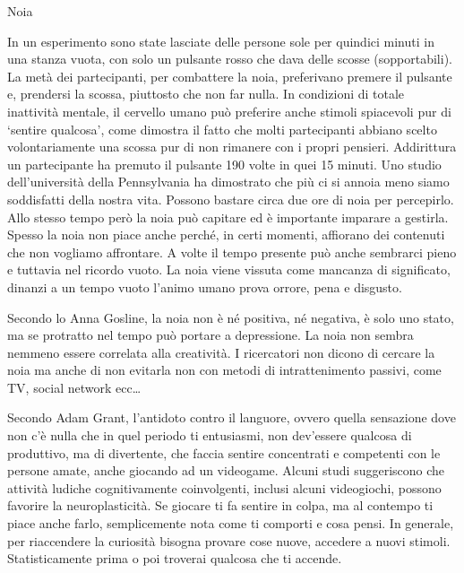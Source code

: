 \documentclass[12pt]{book} %
\begin{document}
\begin{mdframed}[linewidth=1pt]
Noia

In un esperimento sono state lasciate delle persone sole per quindici minuti in una stanza vuota, con solo un pulsante
rosso che dava delle scosse (sopportabili). La metà dei partecipanti, per combattere la noia, preferivano premere il
pulsante e, prendersi la scossa, piuttosto che non far nulla. In condizioni di totale inattività mentale, il cervello umano può preferire anche stimoli spiacevoli pur di ‘sentire qualcosa’, come dimostra il fatto che molti partecipanti abbiano scelto volontariamente una scossa pur di non rimanere con i propri pensieri. Addirittura un partecipante ha premuto il pulsante 190 volte in quei 15
minuti. Uno studio dell'università della Pennsylvania
ha dimostrato che più ci si annoia meno siamo soddisfatti della nostra vita. Possono bastare circa due ore di noia per
percepirlo. Allo stesso tempo però la noia può capitare ed è importante imparare a gestirla.
Spesso la noia non piace anche perché, in certi momenti, affiorano dei contenuti che non vogliamo affrontare. 
A volte il tempo presente può anche sembrarci pieno e tuttavia nel ricordo vuoto. La noia viene vissuta come mancanza
di significato, dinanzi a un tempo vuoto l'animo umano prova orrore, pena e disgusto.

Secondo lo Anna Gosline, la noia non è né positiva, né negativa, è solo uno stato, ma se protratto nel tempo può portare a depressione. La noia non sembra nemmeno essere correlata alla creatività. 
I ricercatori non dicono di cercare la noia ma anche di non evitarla non con metodi di intrattenimento passivi, come TV, social network ecc…

Secondo Adam Grant, l'antidoto contro il languore, ovvero quella sensazione dove non c'è nulla che in quel periodo ti
entusiasmi, non dev'essere qualcosa di produttivo, ma di divertente, che faccia sentire concentrati e competenti con le
persone amate, anche giocando ad un videogame. Alcuni studi suggeriscono che attività ludiche cognitivamente coinvolgenti, inclusi alcuni videogiochi, possono favorire la neuroplasticità. Se giocare ti fa sentire in colpa, ma al
contempo ti piace anche farlo, semplicemente nota come ti comporti e cosa pensi. In generale, per riaccendere la curiosità bisogna provare cose nuove, accedere a nuovi stimoli. Statisticamente prima o poi troverai qualcosa che ti accende.


\end{mdframed}
\end{document}
